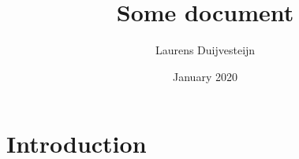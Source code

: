 \documentclass[a4paper]{article}
\title{Some document}
\author{Laurens Duijvesteijn}
\date{January 2020}
\begin{document}
\maketitle

\section{Introduction}
\end{document}
